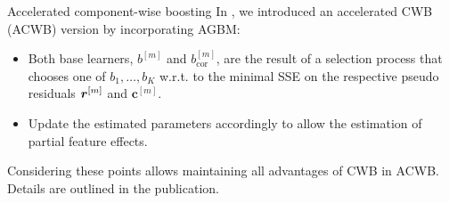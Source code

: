 \documentclass[t,10pt]{beamer}
\begin{document}
%


\begin{frame}{Accelerated component-wise boosting}
  In \citet{schalk2022accelerated}, we introduced an accelerated CWB (ACWB)
  version by incorporating AGBM:

  \begin{itemize}
    \item
      Both base learners, \(b^{[m]}\) and \(b^{[m]}_{\text{cor}}\), are the
      result of a selection process that chooses one of \(b_1, \dots, b_K\)
      w.r.t. to the minimal SSE on the respective pseudo residuals \(\bm{r}^{[m]}\)
      and \(\bm{c}^{[m]}\).
    \item
      Update the estimated parameters accordingly to allow the estimation of
      partial feature effects.
  \end{itemize}
  Considering these points allows maintaining all advantages of CWB in
  ACWB. Details are outlined in the publication.
\end{frame}
\end{document}
